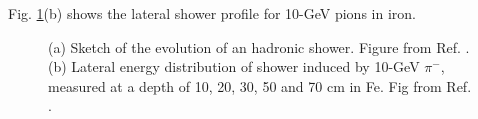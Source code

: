 Fig. \ref{fig:det:shower_had}(b) shows the lateral shower profile for 10-GeV pions in iron.

\begin{figure}[ht]
\centering
{}
\caption{(a) Sketch of the evolution of an hadronic shower. Figure from Ref. \cite{grupen_shwartz_2008}. (b) Lateral energy distribution of shower induced by 10-GeV $\pi^-$, measured at a depth of 10, 20, 30, 50 and 70 cm in Fe. Fig from Ref. \cite{FRIEND1976505}.}
\label{fig:det:shower_had}
\end{figure}

